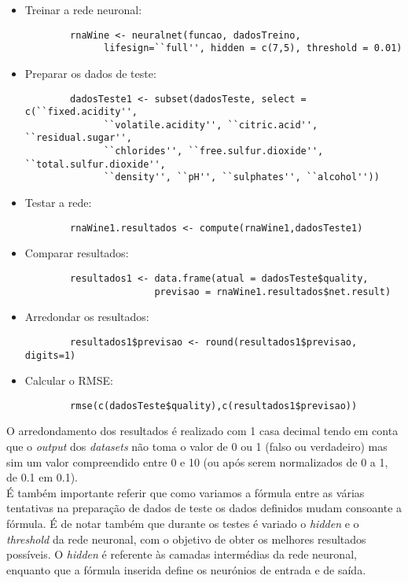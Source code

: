 \documentclass{article}
\begin{document}
\begin{itemize}
    \item Treinar a rede neuronal:
        \begin{verbatim}
        rnaWine <- neuralnet(funcao, dadosTreino, 
              lifesign=``full'', hidden = c(7,5), threshold = 0.01)
        \end{verbatim}
    \item Preparar os dados de teste: 
        \begin{verbatim}
        dadosTeste1 <- subset(dadosTeste, select = c(``fixed.acidity'', 
              ``volatile.acidity'', ``citric.acid'', ``residual.sugar'', 
              ``chlorides'', ``free.sulfur.dioxide'', ``total.sulfur.dioxide'', 
              ``density'', ``pH'', ``sulphates'', ``alcohol''))
        \end{verbatim}
    \item Testar a rede:
        \begin{verbatim}
        rnaWine1.resultados <- compute(rnaWine1,dadosTeste1)
        \end{verbatim}
    \item Comparar resultados:
        \begin{verbatim}
        resultados1 <- data.frame(atual = dadosTeste$quality, 
                       previsao = rnaWine1.resultados$net.result)
        \end{verbatim}
    \item Arredondar os resultados:
        \begin{verbatim}
        resultados1$previsao <- round(resultados1$previsao, digits=1)
        \end{verbatim}
    \item Calcular o RMSE:
        \begin{verbatim}
        rmse(c(dadosTeste$quality),c(resultados1$previsao))
        \end{verbatim}
\end{itemize}

O arredondamento dos resultados é realizado com 1 casa decimal tendo em conta que o \textit{output} dos \textit{datasets} não toma o valor de 0 ou 1 (falso ou verdadeiro) mas sim um valor compreendido entre 0 e 10 (ou após serem normalizados de 0 a 1, de 0.1 em 0.1).\\
É também importante referir que como variamos a fórmula entre as várias tentativas na preparação de dados de teste os dados definidos mudam consoante a fórmula. É de notar também que durante os testes é variado o \textit{hidden} e o \textit{threshold} da rede neuronal, com o objetivo de obter os melhores resultados possíveis.
O \textit{hidden} é referente às camadas intermédias da rede neuronal, enquanto que a fórmula inserida define os neurónios de entrada e de saída.
\end{document}

